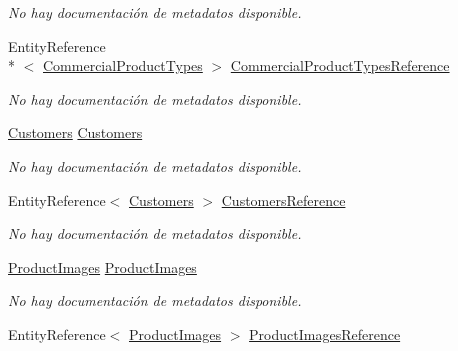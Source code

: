 \begin{DoxyCompactItemize}
\begin{DoxyCompactList}\small\item\em No hay documentación de metadatos disponible. \end{DoxyCompactList}\item 
Entity\-Reference\\*
$<$ \hyperlink{class_game_memory_1_1_commercial_product_types}{Commercial\-Product\-Types} $>$ \hyperlink{class_game_memory_1_1_commercial_products_a57288a4508f92f6aa62dc7402618e8f2}{Commercial\-Product\-Types\-Reference}
\begin{DoxyCompactList}\small\item\em No hay documentación de metadatos disponible. \end{DoxyCompactList}\item 
\hyperlink{class_game_memory_1_1_customers}{Customers} \hyperlink{class_game_memory_1_1_commercial_products_ad685be3364d165d72cc7312b662c9ce7}{Customers}
\begin{DoxyCompactList}\small\item\em No hay documentación de metadatos disponible. \end{DoxyCompactList}\item 
Entity\-Reference$<$ \hyperlink{class_game_memory_1_1_customers}{Customers} $>$ \hyperlink{class_game_memory_1_1_commercial_products_ae025504cc119bffe39d2430da20d9ba1}{Customers\-Reference}
\begin{DoxyCompactList}\small\item\em No hay documentación de metadatos disponible. \end{DoxyCompactList}\item 
\hyperlink{class_game_memory_1_1_product_images}{Product\-Images} \hyperlink{class_game_memory_1_1_commercial_products_ab629e8b21894196949bdae2f5737dd8b}{Product\-Images}
\begin{DoxyCompactList}\small\item\em No hay documentación de metadatos disponible. \end{DoxyCompactList}\item 
Entity\-Reference$<$ \hyperlink{class_game_memory_1_1_product_images}{Product\-Images} $>$ \hyperlink{class_game_memory_1_1_commercial_products_a2edf86daa617b84658102b4aef34c4b0}{Product\-Images\-Reference}

\end{DoxyCompactItemize}
